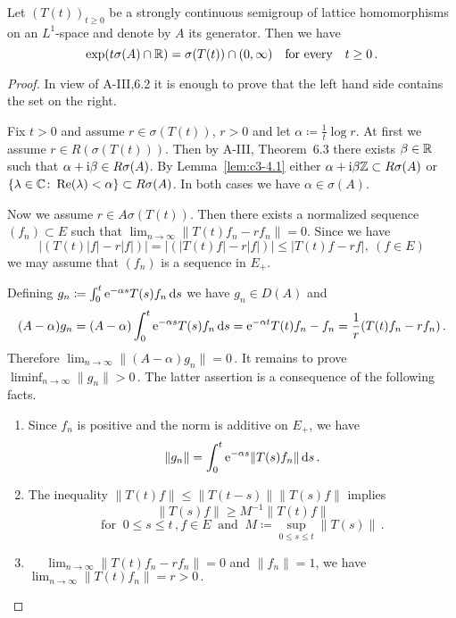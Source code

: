 \begin{proposition}\label{prop:c3-4.5}
Let $(T(t))_{t \geq 0}$ be a strongly continuous semigroup
of lattice homomorphisms on an $L^1$-space and denote by $A$ its generator.
Then we have
\begin{equation}\label{eq:c3-4.7}
	\exp(t\sigma(A) \cap \mathbb{R} ) = \sigma(T(t)) \cap (0,\infty) \quad \text{for every} \quad t \geq 0\,.
\end{equation}
\end{proposition}
\begin{proof}
In view of A-III,6.2 it is enough to prove that the left hand
side contains the set on the right.

Fix $t > 0$ and assume $r \in \sigma(T(t))$, $r > 0$ and let $\alpha \coloneqq \frac{1}{t} \log r$.
At first we assume $r \in R(\sigma(T(t)))$.
Then by A-III, Theorem~6.3 there exists
$\beta \in \mathbb{R} $ such that $\alpha+\mathrm{i}\beta \in R\sigma(A)$.
By Lemma~\ref{lem:c3-4.1} either $\alpha+\mathrm{i}\beta\mathbb{Z} \subset R\sigma(A)$
or $\{\lambda \in \mathbb{C}  \colon \mathop{}\!\mathrm{Re}(\lambda) < \alpha\} \subset R\sigma(A)$.
In both cases we have $\alpha \in \sigma(A)$.

Now we assume $r \in A\sigma(T(t))$. 
Then there exists a normalized sequence
$(f_n) \subset E$ such that $\lim_{n \to \infty}\|T(t)f_n - rf_n\| = 0$.
Since we have
\[
|(T(t)|f| - r|f|)| = |(|T(t)f| - r|f|)| \leq |T(t)f - rf|, \  (f \in E) 
\]
we may assume that $(f_n)$ is a sequence in $E_+$.

Defining $g_n \coloneqq \int_{0}^{t} \mathrm{e}^{-\alpha s}T(s)f_n \mathop{}\!\mathrm{d}{s} $ we have $g_n \in D(A)$ and
\[
(A-\alpha)g_n = (A-\alpha)\int_{0}^{t} \mathrm{e}^{-\alpha s}T(s)f_n \mathop{}\!\mathrm{d}{s} = \mathrm{e}^{-\alpha t}T(t)f_n - f_n = \frac{1}{r}(T(t)f_n - rf_n)\,.
\]
Therefore $\lim_{n \to \infty}\|(A - \alpha) g_n\| = 0$\,. It remains to prove 
$\liminf_{n \to \infty}\|g_n\| > 0$\,.
The latter assertion is a consequence of the following facts.
\begin{enumerate}[\upshape (i),wide, labelindent=.5em]
	\item
	Since $f_n$ is positive and the norm is additive on $E_+$,
	we have
	\[
    \|g_n\| = \int_{0}^{t} \mathrm{e}^{-\alpha s}\|T(s)f_n\| \mathop{}\!\mathrm{d}{s}\,.
    \]
	
	\item 
    The inequality \quad
    $\displaystyle
    \|T(t)f\| \leq \|T(t-s)\|\|T(s)f\|
    $\quad 
    implies
	\[
    \|T(s)f\| \geq M^{-1}\|T(t)f\|
    \]
    \[
    \text{for } \ 0 \leq s \leq t\,, f \in E \ \text{ and } \ M \coloneqq \sup_{0 \leq s \leq t}\|T(s) \|\,.
    \]
    
	 \item 
	 \  \  
     $\displaystyle\lim_{n \to \infty}\|T(t)f_n - rf_n\| = 0$ 
     and $\|f_n\| = 1$, we have
    $\displaystyle
     \lim_{n \to \infty}\|T(t)f_n\| = r > 0\,.
    $
\end{enumerate}
\end{proof}
